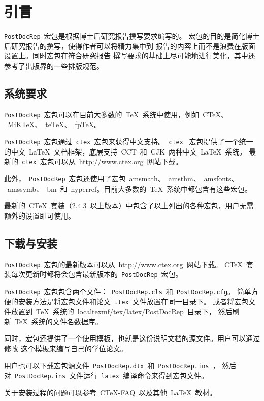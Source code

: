 
\chapter{引言}
\label{chap:introduction}

\texttt{PostDocRep}~宏包是根据博士后研究报告撰写要求编写的。
宏包的目的是简化博士后研究报告的撰写，使得作者可以将精力集中到
报告的内容上而不是浪费在版面设置上。同时宏包在符合研究报告
撰写要求的基础上尽可能地进行美化，其中还参考了出版界的一些排版规范。

\section{系统要求}

\texttt{PostDocRep}~宏包可以在目前大多数的~\TeX{}~系统中使用，例如~C\TeX{}、
~MiK\TeX{}、~te\TeX{}、~fp\TeX{}。

\texttt{PostDocRep}~宏包通过~\texttt{ctex}~宏包来获得中文支持。~\texttt{ctex}~
宏包提供了一个统一的中文~\LaTeX{}~文档框架，底层支持~CCT~和~CJK~两种中文~\LaTeX{}~系统。
最新的~\texttt{ctex}~宏包可以从~\url{http://www.ctex.org}~网站下载。

此外，~\texttt{PostDocRep}~宏包还使用了宏包~amsmath、~amsthm、~amsfonts、
~amssymb、~bm~和~hyperref。目前大多数的~\TeX{}~系统中都包含有这些宏包。

最新的~C\TeX{}~套装（2.4.3~以上版本）中包含了以上列出的各种宏包，用户无需额外的设置即可使用。

\section{下载与安装}

\texttt{PostDocRep}~宏包的最新版本可以从~\url{http://www.ctex.org}~网站下载。
C\TeX{}~套装每次更新时都将会包含最新版本的~\texttt{PostDocRep}~宏包。

\texttt{PostDocRep}~宏包包含两个文件：~\texttt{PostDocRep.cls}~和~\texttt{PostDocRep.cfg}。
简单方便的安装方法是将宏包文件和论文~\texttt{.tex}~文件放置在同一目录下。
或者将宏包文件放置到~\TeX{}~系统的~localtexmf/tex/latex/PostDocRep~目录下，
然后刷新~\TeX{}~系统的文件名数据库。

同时，宏包还提供了一个使用模板，也就是这份说明文档的源文件。用户可以通过修改
这个模板来编写自己的学位论文。

用户也可以下载宏包源文件~\texttt{PostDocRep.dtx}~和~\texttt{PostDocRep.ins}~，
然后对~\texttt{PostDocRep.ins}~文件运行~\texttt{latex}~编译命令来得到宏包文件。

关于安装过程的问题可以参考~C\TeX{}-FAQ~以及其他~\LaTeX{}~教材。


